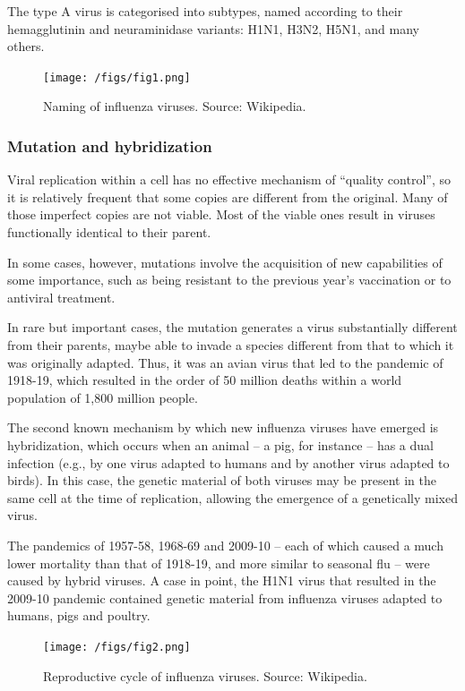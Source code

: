 \documentclass[12pt, a4]{scrartcl}
\begin{document}
The type A virus is categorised into subtypes, named according to their hemagglutinin and neuraminidase variants: H1N1, H3N2, H5N1, and many others.

\begin{figure}[h]
\centering
\texttt{[image: /figs/fig1.png]}
\caption{Naming of influenza viruses. Source: Wikipedia.}
\end{figure}

\subsubsection{Mutation and hybridization}
Viral replication within a cell has no effective mechanism of “quality control”, so it is relatively frequent that some copies are different from the original. Many of those imperfect copies are not viable. Most of the viable ones result in viruses functionally identical to their parent. 

In some cases, however, mutations involve the acquisition of new capabilities of some importance, such as being resistant to the previous year's vaccination or to antiviral treatment. 

In rare but important cases, the mutation generates a virus substantially different from their parents, maybe able to invade a species different from that to which it was originally adapted. Thus, it was an avian virus that led to the pandemic of 1918-19, which resulted in the order of 50 million deaths within a world population of 1,800 million people.

The second known mechanism by which new influenza viruses have emerged is hybridization, which occurs when an animal – a pig, for instance – has a dual infection (e.g., by one virus adapted to humans and by another virus adapted to birds). In this case, the genetic material of both viruses may be present in the same cell at the time of replication, allowing the emergence of a genetically mixed virus.

The pandemics of 1957-58, 1968-69 and 2009-10 – each of which caused a much lower mortality than that of 1918-19, and more similar to seasonal flu – were caused by hybrid viruses. A case in point, the H1N1 virus that resulted in the 2009-10 pandemic contained genetic material from influenza viruses adapted to humans, pigs and poultry.

\begin{figure}[h]
\centering
\texttt{[image: /figs/fig2.png]}
\caption{Reproductive cycle of influenza viruses. Source: Wikipedia.}
\end{figure}
\end{document}
